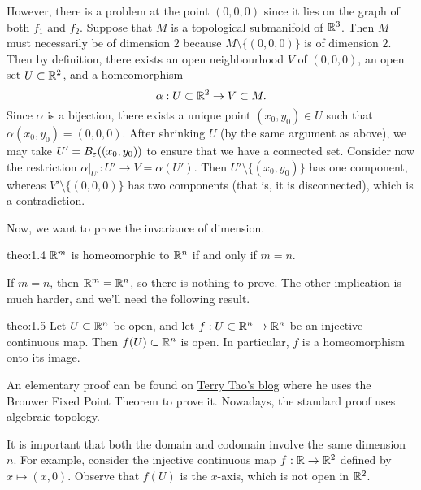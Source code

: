 \begin{enumerate}[(1)]
    However, there is a problem at the point $(0, 0, 0)$ since it 
    lies on the graph of both $f_1$ and $f_2$. Suppose that $M$ 
    is a topological submanifold of $\mathbb{R}^3$. Then $M$ must necessarily be of 
    dimension $2$ because $M \setminus \{(0, 0, 0)\}$ is of dimension $2$. 
    Then by definition, there exists an open neighbourhood $V$ of $(0, 0, 0)$, an 
    open set $U \subset \mathbb{R}^2$, and a homeomorphism 
    \[ \alpha : U \subset \mathbb{R}^2 \to V \subset M. \] 
    Since $\alpha$ is a bijection, there exists a unique point $(x_0, y_0) \in U$ 
    such that $\alpha(x_0, y_0) = (0, 0, 0)$. After shrinking $U$ (by the 
    same argument as above), we may take $U' = B_{\varepsilon}((x_0, y_0))$ to 
    ensure that we have a connected set. Consider now the restriction 
    $\alpha|_{U'} : U' \to V = \alpha(U')$. Then $U' \setminus \{(x_0, y_0)\}$ 
    has one component, whereas $V' \setminus \{(0, 0, 0)\}$ has two components
    (that is, it is disconnected), which is a contradiction. 
\end{enumerate}

\newpage 
Now, we want to prove the invariance of dimension.
\begin{theo}{theo:1.4}
    $\mathbb{R}^m$ is homeomorphic to $\mathbb{R}^n$ if and only if $m = n$. 
\end{theo}\vspace{-0.25cm}
If $m = n$, then $\mathbb{R}^m = \mathbb{R}^n$, so there is nothing to prove. The other 
implication is much harder, and we'll need the following result. 

\begin{theo}{theo:1.5}
    Let $U \subset \mathbb{R}^n$ be open, and let $f : U \subset \mathbb{R}^n \to \mathbb{R}^n$ 
    be an injective continuous map. Then $f(U) \subset \mathbb{R}^n$ is open. 
    In particular, $f$ is a homeomorphism onto its image.
\end{theo}\vspace{-0.25cm}

An elementary proof can be found on 
\href{https://terrytao.wordpress.com/2011/06/13/brouwers-fixed-point-and-invariance-of-domain-theorems-and-hilberts-fifth-problem/}{Terry Tao's blog} 
where he uses the Brouwer Fixed Point Theorem to prove it. Nowadays, the 
standard proof uses algebraic topology. 

It is important that both the domain and codomain involve the same dimension $n$. 
For example, consider the injective continuous map $f : \mathbb{R} \to \mathbb{R}^2$ defined by 
$x \mapsto (x, 0)$. Observe that $f(U)$ is the $x$-axis, which is not open in $\mathbb{R}^2$. 

